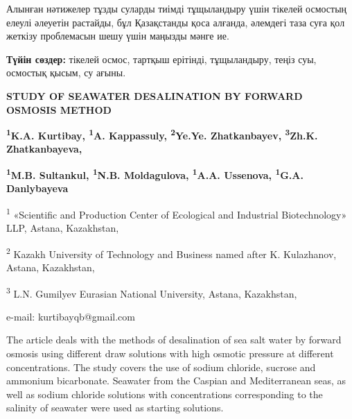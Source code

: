 Алынған нәтижелер тұзды суларды тиімді тұщыландыру үшін тікелей осмостың
елеулі әлеуетін растайды, бұл Қазақстанды қоса алғанда, әлемдегі таза
суға қол жеткізу проблемасын шешу үшін маңызды мәнге ие.

{\bfseries Түйін сөздер:} тікелей осмос, тартқыш ерітінді, тұщыландыру,
теңіз суы, осмостық қысым, су ағыны.

\begin{articleheader}
{\bfseries STUDY OF SEAWATER DESALINATION BY FORWARD OSMOSIS METHOD}

{\bfseries \textsuperscript{1}K.A. Kurtibay\textsuperscript{\envelope },
\textsuperscript{1}A. Kappassuly, \textsuperscript{2}Ye.Ye.
Zhatkanbayev, \textsuperscript{3}Zh.K. Zhatkanbayeva,}

{\bfseries \textsuperscript{1}M.B. Sultankul, \textsuperscript{1}N.B.
Moldagulova, \textsuperscript{1}A.A. Ussenova, \textsuperscript{1}G.A.
Danlybayeva}
\end{articleheader}

\begin{affiliation}
\textsuperscript{1} «Scientific and Production Center of Ecological and
Industrial Biotechnology» LLP, Astana, Kazakhstan,

\textsuperscript{2} Kazakh University of Technology and Business named
after K. Kulazhanov, Astana, Kazakhstan,

\textsuperscript{3} L.N. Gumilyev Eurasian National University, Astana,
Kazakhstan,

e-mail: kurtibayqb@gmail.com
\end{affiliation}

The article deals with the methods of desalination of sea salt water by
forward osmosis using different draw solutions with high osmotic
pressure at different concentrations. The study covers the use of sodium
chloride, sucrose and ammonium bicarbonate. Seawater from the Caspian
and Mediterranean seas, as well as sodium chloride solutions with
concentrations corresponding to the salinity of seawater were used as
starting solutions.


